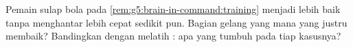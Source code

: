 \begin{exercise}[$\star\star\star$]\label{exo:g5:brain-in-command:11}
Pemain sulap bola pada \cref{rem:g5:brain-in-command:training} menjadi
lebih baik tanpa  menghantar lebih cepat sedikit pun. Bagian
gelang yang mana yang justru membaik? Bandingkan dengan melatih :
apa yang tumbuh pada tiap kasusnya?
\end{exercise}
